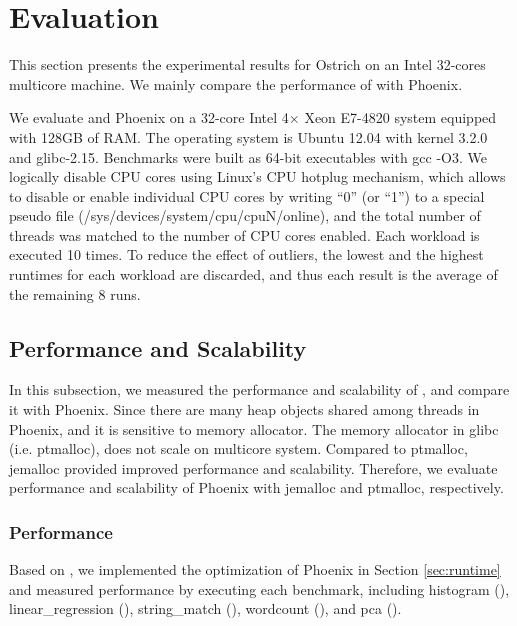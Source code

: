 \section{Evaluation}
\label{sec:eval}
This section presents the experimental results for Ostrich on an Intel 32-cores multicore machine. 
We mainly compare the performance of \myds with Phoenix.

We evaluate \myds and Phoenix on a 32-core Intel 4× Xeon E7-4820 system equipped with 128GB of RAM. 
The operating system is Ubuntu 12.04 with kernel 3.2.0 and glibc-2.15.
Benchmarks were built as 64-bit executables with gcc -O3.
We logically disable CPU cores using Linux’s CPU hotplug mechanism, which allows to disable or enable individual CPU cores by writing “0” (or “1”) to a special pseudo file (/sys/devices/system/cpu/cpuN/online), and the total number of threads was matched to the number of CPU cores enabled.
Each workload is executed 10 times. 
To reduce the effect of outliers, the lowest and the highest runtimes for each workload are discarded, and thus each result is the average of the remaining 8 runs.

\subsection{Performance and Scalability}
In this subsection, we measured the performance and scalability of \myds, and compare it with Phoenix.  
Since there are many heap objects shared among threads in Phoenix, and it is sensitive to memory allocator.
The memory allocator in glibc (i.e. ptmalloc\cite{gloger1997ptmalloc}), does not scale on multicore system. 
Compared to ptmalloc\cite{gloger1997ptmalloc}, jemalloc provided improved performance and scalability\cite{evans2006jemalloc}. 
Therefore, we evaluate performance and scalability of Phoenix with jemalloc and ptmalloc, respectively.

\subsubsection{Performance}
Based on \myth, we implemented the optimization of Phoenix in Section \ref{sec:runtime} and measured \myds performance by executing each benchmark, including histogram (), linear\_regression (), string\_match (), wordcount (), and pca (). 


